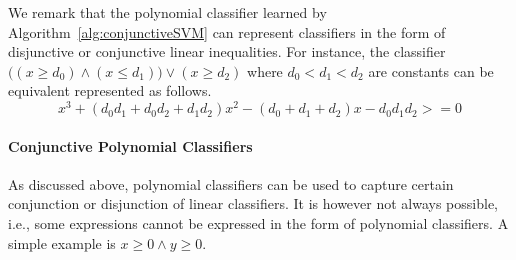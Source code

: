 We remark that the polynomial classifier learned by Algorithm~\ref{alg:conjunctiveSVM} can represent classifiers in the form of disjunctive or conjunctive linear inequalities.
For instance, the classifier $\big((x \ge d_0) \wedge (x \le d_1)\big) \vee (x \ge d_2)$
where $d_0 < d_1 < d_2$ are constants can be equivalent represented as follows.
\[x^3 + (d_0d_1 + d_0d_2 + d_1d_2)x^2 - (d_0 + d_1 + d_2)x - d_0d_1d_2 >= 0\]


\paragraph{Conjunctive Polynomial Classifiers}
As discussed above, polynomial classifiers can be used to capture certain conjunction or disjunction of linear classifiers. It is however not always possible, i.e., some expressions cannot be expressed in the form of polynomial classifiers. A simple example is $x \ge 0 \land y \ge 0$.

